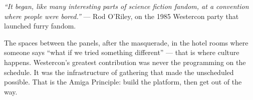 \documentclass[11pt,letterpaper]{article}
\begin{document}
\vspace{1em}

\begin{quotebox}
\textit{``It began, like many interesting parts of science fiction fandom, at a convention where people were bored.''} --- Rod O'Riley, on the 1985 Westercon party that launched furry fandom.

\vspace{0.5em}

The spaces between the panels, after the masquerade, in the hotel rooms where someone says ``what if we tried something different'' --- that is where culture happens. Westercon's greatest contribution was never the programming on the schedule. It was the infrastructure of gathering that made the unscheduled possible. That is the Amiga Principle: build the platform, then get out of the way.
\end{quotebox}
\end{document}
